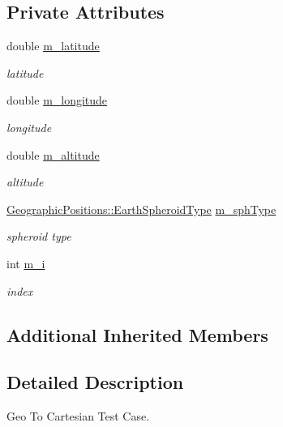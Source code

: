 \subsection*{Private Attributes}
\begin{DoxyCompactItemize}
\item 
double \hyperlink{classGeoToCartesianTestCase_a9902e23dd6ffe03e801cd1be758d978d}{m\+\_\+latitude}
\begin{DoxyCompactList}\small\item\em latitude \end{DoxyCompactList}\item 
double \hyperlink{classGeoToCartesianTestCase_a0b934f42b5af86efff9ad42f01e2e949}{m\+\_\+longitude}
\begin{DoxyCompactList}\small\item\em longitude \end{DoxyCompactList}\item 
double \hyperlink{classGeoToCartesianTestCase_a786ef59877cc3d553ca359d7ddfcaa21}{m\+\_\+altitude}
\begin{DoxyCompactList}\small\item\em altitude \end{DoxyCompactList}\item 
\hyperlink{classns3_1_1GeographicPositions_a434138b76563c284972bc08a9c4a6882}{Geographic\+Positions\+::\+Earth\+Spheroid\+Type} \hyperlink{classGeoToCartesianTestCase_abf771e651f997641307173e08610a7d4}{m\+\_\+sph\+Type}
\begin{DoxyCompactList}\small\item\em spheroid type \end{DoxyCompactList}\item 
int \hyperlink{classGeoToCartesianTestCase_aeeb6a9cb21dad88d5ea4d939bf444f95}{m\+\_\+i}
\begin{DoxyCompactList}\small\item\em index \end{DoxyCompactList}\end{DoxyCompactItemize}
\subsection*{Additional Inherited Members}


\subsection{Detailed Description}
Geo To Cartesian Test Case. 


